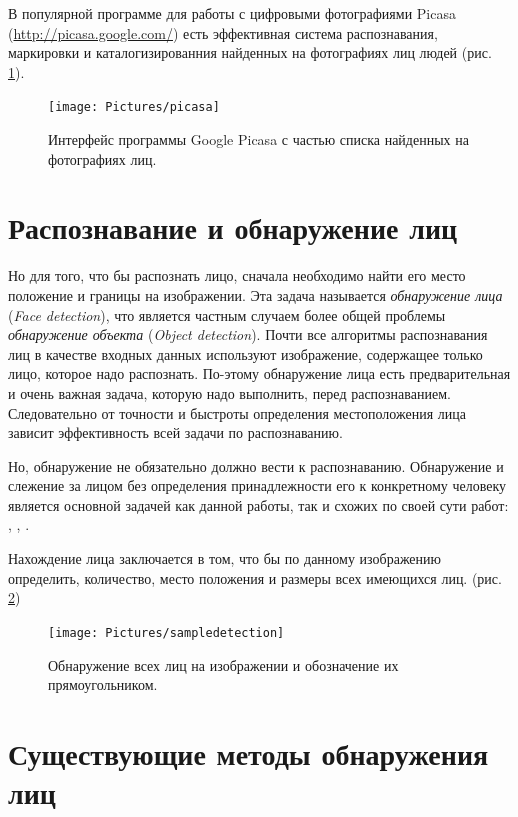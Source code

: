 \documentclass[12pt]{report}
\begin{document}
В популярной программе для работы с цифровыми фотографиями Picasa (\url{http://picasa.google.com/}) есть эффективная 
система распознавания, маркировки и каталогизированния найденных на фотографиях лиц людей (рис. \ref{fig:picasa}). 

\begin{figure}[h]
	\centering
	\texttt{[image: Pictures/picasa]}
	\caption{Интерфейс программы Google Picasa с частью списка найденных на фотографиях лиц.}
	\label{fig:picasa}
\end{figure}

\section{Распознавание и обнаружение лиц}

Но для того, что бы распознать лицо, сначала необходимо найти его место положение и границы на изображении. Эта 
задача называется \emph{обнаружение лица} (\textit{Face detection}), что является частным случаем более общей 
проблемы \emph{обнаружение объекта} (\textit{Object detection}). Почти все алгоритмы распознавания лиц в качестве 
входных данных используют изображение, содержащее только лицо, которое надо распознать. По-этому обнаружение лица 
есть предварительная и очень важная задача, которую надо выполнить, перед распознаванием. Следовательно от точности и 
быстроты определения местоположения лица зависит эффективность всей задачи по распознаванию. 

Но, обнаружение не обязательно должно вести к распознаванию. Обнаружение и слежение за лицом без определения 
принадлежности его к конкретному человеку является основной задачей как данной работы, так и схожих по своей сути 
работ: \citep{capi2010vision}, \citep{luo2007face}, \citep{saxena2008real}.

Нахождение лица заключается в том, что бы по данному изображению определить, количество, место положения и размеры 
всех имеющихся лиц. (рис. \ref{fig:sampledetection}) \citep{liu2010automatically}

\begin{figure}[h]
	\centering
	\texttt{[image: Pictures/sampledetection]}
	\caption{Обнаружение всех лиц на изображении и обозначение их прямоугольником.}
	\label{fig:sampledetection}
\end{figure}

\section{Существующие методы обнаружения лиц}
\end{document}

